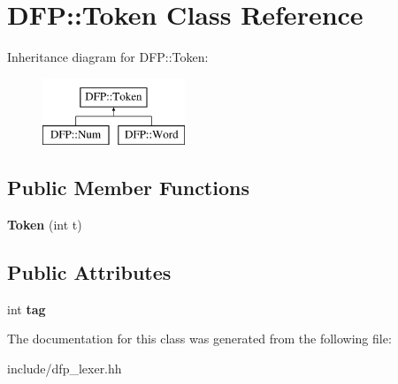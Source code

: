 \hypertarget{class_d_f_p_1_1_token}{}\section{D\+FP\+:\+:Token Class Reference}
\label{class_d_f_p_1_1_token}
Inheritance diagram for D\+FP\+:\+:Token\+:\begin{figure}[H]
\begin{center}
\leavevmode
\includegraphics[height=2.000000cm]{class_d_f_p_1_1_token}
\end{center}
\end{figure}
\subsection*{Public Member Functions}
\begin{DoxyCompactItemize}
\item 
{\bfseries Token} (int t)\hypertarget{class_d_f_p_1_1_token_a6ce43ce39be66b0d78cf3160f4f6c448}{}\label{class_d_f_p_1_1_token_a6ce43ce39be66b0d78cf3160f4f6c448}

\end{DoxyCompactItemize}
\subsection*{Public Attributes}
\begin{DoxyCompactItemize}
\item 
int {\bfseries tag}\hypertarget{class_d_f_p_1_1_token_a696bd129a31cf17f47df4e4ebae80fe0}{}\label{class_d_f_p_1_1_token_a696bd129a31cf17f47df4e4ebae80fe0}

\end{DoxyCompactItemize}


The documentation for this class was generated from the following file\+:\begin{DoxyCompactItemize}
\item 
include/dfp\+\_\+lexer.\+hh\end{DoxyCompactItemize}
